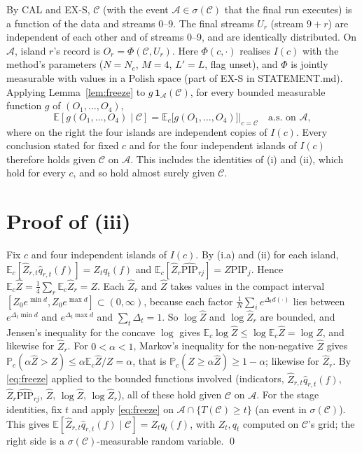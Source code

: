 \documentclass[11pt]{article}
\theoremstyle{remark}
\newcommand{\E}{\mathbb{E}}
\renewcommand{\P}{\mathbb{P}}
\newcommand{\cC}{\mathcal{C}}
\newcommand{\cA}{\mathcal{A}}
\newcommand{\Zh}{\widehat Z}
\newcommand{\qh}{\widehat q}
\newcommand{\PIPh}{\widehat{\mathrm{PIP}}}
\newcommand{\PIP}{\mathrm{PIP}}
\newcommand{\ind}{\mathbf 1}
\begin{document}
By CAL and EX-S, $\cC$ (with the event $\cA\in\sigma(\cC)$ that the final run executes) is a function of the data and streams 0--9. The final streams $U_r$ (stream $9+r$) are independent of each other and of streams 0--9, and are identically distributed. On $\cA$, island $r$'s record is $O_r=\Phi(\cC,U_r)$. Here $\Phi(c,\cdot)$ realises $I(c)$ with the method's parameters ($N=N_e$, $M=4$, $L'=L$, flag unset), and $\Phi$ is jointly measurable with values in a Polish space (part of EX-S in STATEMENT.md). Applying Lemma~\ref{lem:freeze} to $g\,\ind_\cA(\cC)$, for every bounded measurable function $g$ of $(O_1,\dots,O_4)$,
\begin{equation}\label{eq:freeze}
\E[g(O_1,\dots,O_4)\mid\cC]=\E_c\big[g(O_1,\dots,O_4)\big]\big|_{c=\cC}\quad\text{a.s. on }\cA,
\end{equation}
where on the right the four islands are independent copies of $I(c)$. Every conclusion stated for fixed $c$ and for the four independent islands of $I(c)$ therefore holds given $\cC$ on $\cA$. This includes the identities of (i) and (ii), which hold for every $c$, and so hold almost surely given $\cC$.

\section{Proof of (iii)}

Fix $c$ and four independent islands of $I(c)$. By (i.a) and (ii) for each island, $\E_c[\Zh_{r,t}\qh_{r,t}(f)]=Z_tq_t(f)$ and $\E_c[\Zh_r\PIPh_{rj}]=Z\PIP_j$. Hence $\E_c\Zh=\frac14\sum_r\E_c\Zh_r=Z$. Each $\Zh_r$ and $\Zh$ takes values in the compact interval $[Z_0e^{\min d},Z_0e^{\max d}]\subset(0,\infty)$, because each factor $\frac1N\sum_ie^{\Delta_td(\cdot)}$ lies between $e^{\Delta_t\min d}$ and $e^{\Delta_t\max d}$ and $\sum_t\Delta_t=1$. So $\log\Zh$ and $\log\Zh_r$ are bounded, and Jensen's inequality for the concave $\log$ gives $\E_c\log\Zh\le\log\E_c\Zh=\log Z$, and likewise for $\Zh_r$. For $0<\alpha<1$, Markov's inequality for the non-negative $\Zh$ gives $\P_c(\alpha\Zh>Z)\le\alpha\E_c\Zh/Z=\alpha$, that is $\P_c(Z\ge\alpha\Zh)\ge1-\alpha$; likewise for $\Zh_r$. By \eqref{eq:freeze} applied to the bounded functions involved (indicators, $\Zh_{r,t}\qh_{r,t}(f)$, $\Zh_r\PIPh_{rj}$, $\Zh$, $\log\Zh$, $\log\Zh_r$), all of these hold given $\cC$ on $\cA$. For the stage identities, fix $t$ and apply \eqref{eq:freeze} on $\cA\cap\{T(\cC)\ge t\}$ (an event in $\sigma(\cC)$). This gives $\E[\Zh_{r,t}\qh_{r,t}(f)\mid\cC]=Z_tq_t(f)$, with $Z_t,q_t$ computed on $\cC$'s grid; the right side is a $\sigma(\cC)$-measurable random variable. \qed
\end{document}
